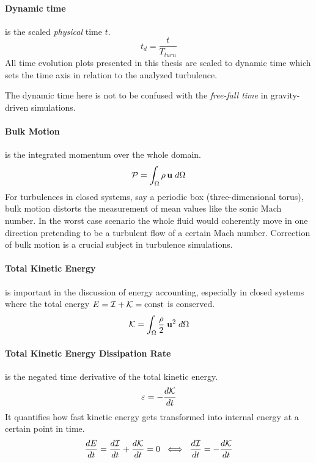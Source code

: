 \paragraph{Dynamic time}
is the scaled \emph{physical} time $t$.
\begin{equation}
    t_d = \frac{t}{T_{turn}}
\end{equation}
All time evolution plots presented in this thesis are scaled to dynamic
time which sets the time axis in relation to the analyzed turbulence. 

\remark The dynamic time here is not to be confused with the \emph{free-fall
time} in gravity-driven simulations.

\paragraph{Bulk Motion}
is the integrated momentum over the whole domain.
\begin{equation}
\label{eqn:bulk-motion}
    \mathbf{\mathcal{P}} = \int_{\Omega} \rho\,\mathbf{u} \; d\Omega
\end{equation}
For turbulences in closed systems, say a periodic box
(three-dimensional torus), bulk motion distorts the measurement of
mean values like the sonic Mach number. In the worst case scenario the whole
fluid would coherently move in one direction pretending to be a turbulent flow
of a certain Mach number. Correction of bulk motion is a crucial subject
in turbulence simulations.

\paragraph{Total Kinetic Energy}
is important in the discussion of energy accounting, especially in closed
systems where the total energy $E = \mathcal{I} + \mathcal{K} = \text{const}$ is
conserved.
\begin{equation}
\label{eqn:ekin}
    \mathcal{K} = \int_\Omega \frac{\rho}{2} \; \mathbf{u}^2 \; d\Omega
\end{equation}

\paragraph{Total Kinetic Energy Dissipation Rate}
is the negated time derivative of the total kinetic energy.
\begin{equation}
\label{eqn:ekindisp}
    \varepsilon = -\frac{d\mathcal{K}}{dt} 
\end{equation}
It quantifies how fast kinetic energy gets transformed into internal
energy at a certain point in time. 
\begin{equation}
\label{eqn:ekindisp-zero}
    \frac{dE}{dt} = \frac{d\mathcal{I}}{dt} + \frac{d\mathcal{K}}{dt} = 0 \;\;
        \Longleftrightarrow \;\; \frac{d\mathcal{I}}{dt} = -\frac{d\mathcal{K}}{dt}
\end{equation}

